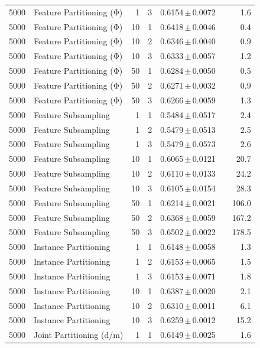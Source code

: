 \begin{table}[ht]
\begin{tabular}{rlrrccr}
5000 & Feature Partitioning (Φ) & 1 & 3 & 0.6154\,$\pm$\,0.0072 &  & 1.6 \\
5000 & Feature Partitioning (Φ) & 10 & 1 & 0.6418\,$\pm$\,0.0046 &  & 0.4 \\
5000 & Feature Partitioning (Φ) & 10 & 2 & 0.6346\,$\pm$\,0.0040 &  & 0.9 \\
5000 & Feature Partitioning (Φ) & 10 & 3 & 0.6333\,$\pm$\,0.0057 &  & 1.2 \\
5000 & Feature Partitioning (Φ) & 50 & 1 & 0.6284\,$\pm$\,0.0050 &  & 0.5 \\
5000 & Feature Partitioning (Φ) & 50 & 2 & 0.6271\,$\pm$\,0.0032 &  & 0.9 \\
5000 & Feature Partitioning (Φ) & 50 & 3 & 0.6266\,$\pm$\,0.0059 &  & 1.3 \\
5000 & Feature Subsampling & 1 & 1 & 0.5484\,$\pm$\,0.0517 &  & 2.4 \\
5000 & Feature Subsampling & 1 & 2 & 0.5479\,$\pm$\,0.0513 &  & 2.5 \\
5000 & Feature Subsampling & 1 & 3 & 0.5479\,$\pm$\,0.0573 &  & 2.6 \\
5000 & Feature Subsampling & 10 & 1 & 0.6065\,$\pm$\,0.0121 &  & 20.7 \\
5000 & Feature Subsampling & 10 & 2 & 0.6110\,$\pm$\,0.0133 &  & 24.2 \\
5000 & Feature Subsampling & 10 & 3 & 0.6105\,$\pm$\,0.0154 &  & 28.3 \\
5000 & Feature Subsampling & 50 & 1 & 0.6214\,$\pm$\,0.0021 &  & 106.0 \\
5000 & Feature Subsampling & 50 & 2 & 0.6368\,$\pm$\,0.0059 &  & 167.2 \\
5000 & Feature Subsampling & 50 & 3 & 0.6502\,$\pm$\,0.0022 &  & 178.5 \\
5000 & Instance Partitioning & 1 & 1 & 0.6148\,$\pm$\,0.0058 &  & 1.3 \\
5000 & Instance Partitioning & 1 & 2 & 0.6153\,$\pm$\,0.0065 &  & 1.5 \\
5000 & Instance Partitioning & 1 & 3 & 0.6153\,$\pm$\,0.0071 &  & 1.8 \\
5000 & Instance Partitioning & 10 & 1 & 0.6387\,$\pm$\,0.0020 &  & 2.1 \\
5000 & Instance Partitioning & 10 & 2 & 0.6310\,$\pm$\,0.0011 &  & 6.1 \\
5000 & Instance Partitioning & 10 & 3 & 0.6259\,$\pm$\,0.0012 &  & 15.2 \\
5000 & Joint Partitioning (d/m) & 1 & 1 & 0.6149\,$\pm$\,0.0025 &  & 1.6 \\

\end{tabular}
\end{table}
